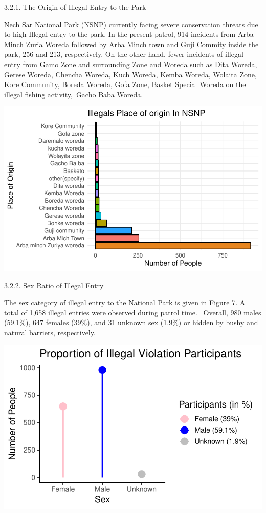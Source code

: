\documentclass[
  letterpaper,
  DIV=11,
  numbers=noendperiod]{scrartcl}
\begin{document}
3.2.1. The Origin of Illegal Entry to the Park

Nech Sar National Park (NSNP) currently facing severe conservation
threats due to high Illegal entry to the park. In the present patrol,
914 incidents from Arba Minch Zuria Woreda followed by Arba Minch town
and Guji Commity inside the park, 256 and 213, respectively. On the
other hand, fewer incidents of illegal entry from Gamo Zone and
surrounding Zone and Woreda such as Dita Woreda, Gerese Woreda, Chencha
Woreda, Kuch Woreda, Kemba Woreda, Wolaita Zone, Kore Community, Boreda
Woreda, Gofa Zone, Basket Special Woreda on the illegal fishing
activity,~Gacho Baba Woreda.

\includegraphics{Final_files/figure-pdf/unnamed-chunk-2-1.pdf}

3.2.2. Sex Ratio of Illegal Entry

The sex category of illegal entry to the National Park is given in
Figure 7. A total of 1,658 illegal entries were observed during patrol
time. ~Overall, 980 males (59.1\%), 647 females (39\%), and 31 unknown
sex (1.9\%) or hidden by bushy and natural barriers, respectively.

\includegraphics{Final_files/figure-pdf/unnamed-chunk-3-1.pdf}
\end{document}
